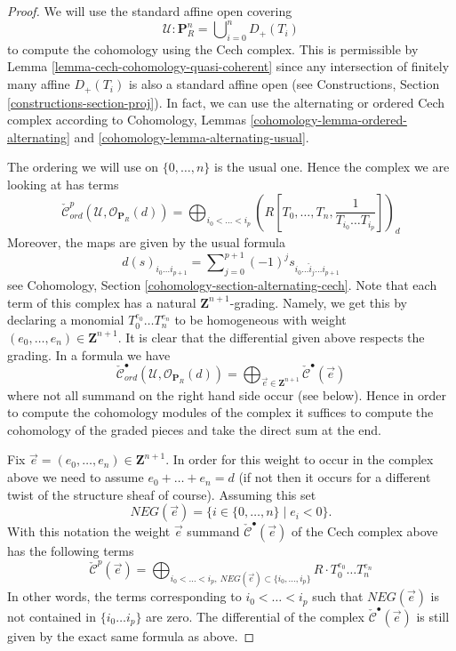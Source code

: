 \begin{proof}
We will use the standard affine open covering
$$
\mathcal{U} : \mathbf{P}^n_R = \bigcup\nolimits_{i = 0}^n D_{+}(T_i)
$$
to compute the cohomology using the Cech complex.
This is permissible by Lemma \ref{lemma-cech-cohomology-quasi-coherent}
since any intersection of finitely many affine $D_{+}(T_i)$ is also a
standard affine open (see
Constructions, Section \ref{constructions-section-proj}).
In fact, we can use the alternating or ordered Cech complex according to
Cohomology, Lemmas \ref{cohomology-lemma-ordered-alternating} and
\ref{cohomology-lemma-alternating-usual}.

\medskip\noindent
The ordering we will use on $\{0, \ldots, n\}$ is the usual one.
Hence the complex we are looking at has terms
$$
\check{\mathcal{C}}_{ord}^p(\mathcal{U}, \mathcal{O}_{\mathbf{P}_R}(d))
=
\bigoplus\nolimits_{i_0 < \ldots < i_p}
(R[T_0, \ldots, T_n, \frac{1}{T_{i_0} \ldots T_{i_p}}])_d
$$
Moreover, the maps are given by the usual formula
$$
d(s)_{i_0 \ldots i_{p + 1}} =
\sum\nolimits_{j = 0}^{p + 1} (-1)^j s_{i_0 \ldots \hat i_j \ldots i_{p + 1}}
$$
see Cohomology, Section \ref{cohomology-section-alternating-cech}.
Note that each term of this complex has a natural
$\mathbf{Z}^{n + 1}$-grading. Namely, we get this by declaring a monomial
$T_0^{e_0} \ldots T_n^{e_n}$ to be homogeneous with weight
$(e_0, \ldots, e_n) \in \mathbf{Z}^{n + 1}$. It is clear that the differential
given above respects the grading. In a formula we have
$$
\check{\mathcal{C}}_{ord}^\bullet(\mathcal{U}, \mathcal{O}_{\mathbf{P}_R}(d))
=
\bigoplus\nolimits_{\vec{e} \in \mathbf{Z}^{n + 1}}
\check{\mathcal{C}}^\bullet(\vec{e})
$$
where not all summand on the right hand side occur (see below).
Hence in order to compute the cohomology
modules of the complex it suffices to compute the cohomology of the graded
pieces and take the direct sum at the end.

\medskip\noindent
Fix $\vec{e} = (e_0, \ldots, e_n) \in \mathbf{Z}^{n + 1}$. In order for this
weight to occur in the complex above we need to assume
$e_0 + \ldots + e_n = d$ (if not then it occurs for a different twist of
the structure sheaf of course). Assuming this set
$$
NEG(\vec{e}) = \{i \in \{0, \ldots, n\} \mid e_i < 0\}.
$$
With this notation the weight $\vec{e}$ summand
$\check{\mathcal{C}}^\bullet(\vec{e})$ of the Cech complex above has
the following terms
$$
\check{\mathcal{C}}^p(\vec{e})
=
\bigoplus\nolimits_{i_0 < \ldots < i_p,
\ NEG(\vec{e}) \subset \{i_0, \ldots, i_p\}}
R \cdot T_0^{e_0} \ldots T_n^{e_n}
$$
In other words, the terms corresponding to $i_0 < \ldots < i_p$ such
that $NEG(\vec{e})$ is not contained in $\{i_0 \ldots i_p\}$ are zero.
The differential of the complex $\check{\mathcal{C}}^\bullet(\vec{e})$
is still given by the exact same formula as above.


\end{proof}
